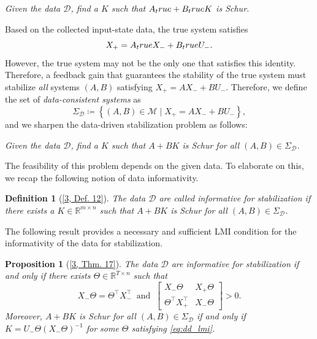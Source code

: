 \documentclass[10pt,a4paper]{amsart}
\newcommand{\set}[2]{\left\{#1 \mid #2\right\}}
\newtheorem{proposition}[theorem]{Proposition}
\newtheorem{definition}[theorem]{Definition}
\begin{document}
\begin{center}
\textit{Given the data $\mathcal{D}$, find a $K$ such that $A_\textup{true}+B_\textup{true}K$ is Schur.}
\end{center}
Based on the collected input-state data, the true system satisfies 
\begin{equation}
\label{eq:lineqtrue}
X_+=A_\textup{true}X_-+B_\textup{true}U_-.
\end{equation}
However, the true system may not be the only one that satisfies this identity. Therefore, a feedback gain that guarantees the stability of the true system must stabilize \emph{all} systems $(A,B)$ satisfying \mbox{$X_+=AX_-+BU_-$}. Therefore, we define the set of \emph{data-consistent systems} as
\begin{equation}
\label{eq:exp}
\Sigma_\mathcal{D}\coloneqq \set{(A,B)\in\mathcal{M}}{X_+=AX_-+BU_-},
\end{equation}
and we sharpen the data-driven stabilization problem as follows:
\begin{center}
\textit{Given the data $\mathcal{D}$, find a $K$ such that $A+BK$ is Schur for all $(A,B)\in\Sigma_\mathcal{D}$.}
\end{center}
The feasibility of this problem depends on the given data. To elaborate on this, we recap the following notion of data informativity. 

\begin{definition}[{\href{https://arxiv.org/abs/2510.25452v3}{[3, Def. 12]}}]
\label{def:1}
The data $\mathcal{D}$ are called \emph{informative for stabilization} if there exists a $K\in\mathbb{R}^{m\times n}$ such that $A+BK$ is Schur for all $(A,B)\in\Sigma_\mathcal{D}$. 
\end{definition}

The following result provides a necessary and sufficient LMI condition for the informativity of the data for stabilization.

\begin{proposition}[{\href{https://arxiv.org/abs/2510.25452v3}{[3, Thm. 17]}}]
\label{prop:1}
The data $\mathcal{D}$ are informative for stabilization \emph{if and only if} there exists $\Theta\in\mathbb{R}^{T\times n}$ such that
\begin{equation}
\label{eq:dd_lmi}
X_-\Theta=\Theta^\top X_-^\top\ \text{ and }\ \begin{bmatrix}
X_-\Theta & X_+\Theta \\
\Theta^\top X_+^\top & X_-\Theta
\end{bmatrix}>0.
\end{equation}
Moreover, $A+BK$ is Schur for all $(A,B)\in\Sigma_\mathcal{D}$ \emph{if and only if} $K=U_-\Theta(X_-\Theta)^{-1}$ for some $\Theta$ satisfying \eqref{eq:dd_lmi}. 
\end{proposition}
\end{document}
